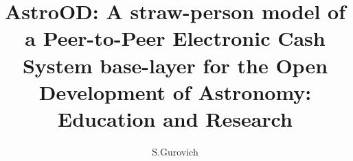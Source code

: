 \documentclass[final,5p,times,twocolumn,authoryear]{elsarticle}
\begin{document}
\begin{frontmatter}

\title{ AstroOD: A straw-person model of a Peer-to-Peer Electronic Cash System base-layer for the Open Development of Astronomy: Education and Research}
 
    \author[iate,wsu]{S.Gurovich}
  
\address[iate]{
   Instituto De Astronom\'ia Te\'orica y Experimental -
   Observatorio Astron\'omico C\'ordoba (IATE--OAC--UNC--CONICET),
   Laprida 854, X5000BGR, C\'ordoba, Argentina}
\address[wsu]{
   Western Sydney University, Kingswood campus, NSW, Australia
}

\begin{abstract}


\end{abstract}
\end{frontmatter}
\end{document}

